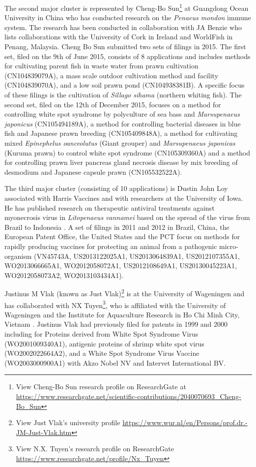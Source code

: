 \documentclass[openany]{book}
\let\rmarkdownfootnote\footnote%
\def\footnote{\protect\rmarkdownfootnote}
\theoremstyle{definition}
\theoremstyle{definition}
\theoremstyle{definition}
\theoremstyle{remark}
\begin{document}
The second major cluster is represented by Cheng-Bo Sun\footnote{View
  Cheng-Bo Sun research profile on ResearchGate at
  \url{https://www.researchgate.net/scientific-contributions/2040070693_Cheng-Bo_Sun}}
at Guangdong Ocean University in China who has conducted research on the
\emph{Penaeus mondon} immune system. The research has been conducted in
collaboration with JA Benzie who lists collaborations with the
University of Cork in Ireland and WorldFish in Penang, Malaysia. Cheng
Bo Sun submitted two sets of filings in 2015. The first set, filed on
the 9th of June 2015, consists of 8 applications and includes methods
for cultivating parent fish in waste water from prawn cultivation
(CN104839079A), a mass scale outdoor cultivation method and facility
(CN104839070A), and a low soil prawn pond (CN104938381B). A specific
focus of these filings is the cultivation of \emph{Sillago sihama}
(northern whiting fish). The second set, filed on the 12th of December
2015, focuses on a method for controlling white spot syndrome by
polyculture of sea bass and \emph{Marsupenaeus japonicus}
(CN105494189A), a method for controlling bacterial diseases in blue fish
and Japanese prawn breeding (CN105409848A), a method for cultivating
mixed \emph{Epinephelus oanceolutus} (Giant grouper) and
\emph{Marsupenaeus japonicas} (Kuruma prawn) to control white spot
syndrome (CN105309360A) and a method for controlling prawn liver
pancreas gland necrosis disease by mix breeding of desmodium and
Japanese capsule prawn (CN105532522A).

The third major cluster (consisting of 10 applications) is Dustin John
Loy associated with Harris Vaccines and with researchers at the
University of Iowa. He has published research on therapeutic antiviral
treatments against myonecrosis virus in \emph{Litopenaeus vannamei}
based on the spread of the virus from Brazil to Indonesia
\citep{Loy_2012, Loy_2013}. A set of filings in 2011 and 2012 in Brazil,
China, the European Patent Office, the United States and the PCT focus
on methods for rapidly producing vaccines for protecting an animal from
a pathogenic micro-organism (VN45743A, US2013122025A1, US2013064839A1,
US2012107355A1, WO2013066665A1, WO2012058072A1, US2012108649A1,
US20130045223A1, WO2012058073A2, WO2013103434A1).

Justinus M Vlak (known as Just Vlak)\footnote{View Just Vlak's
  university profile
  \url{https://www.wur.nl/en/Persons/prof.dr.-JM-Just-Vlak.htm}} is at
the University of Wageningen and has collaborated with NX
Tuyen\footnote{View N.X. Tuyen's research profile on ResearchGate
  \url{https://www.researchgate.net/profile/Nx_Tuyen}}, who is
affiliated with the University of Wageningen and the Institute for
Aquaculture Research in Ho Chi Minh City, Vietnam
\citep[see][]{Tuyen_2014}. Justinus Vlak had previously filed for
patents in 1999 and 2000 including for Proteins derived from White Spot
Syndrome Virus (WO2001009340A1), antigenic proteins of shrimp white spot
virus (WO2002022664A2), and a White Spot Syndrome Virus Vaccine
(WO2003000900A1) with Akzo Nobel NV and Intervet International BV.
\end{document}

